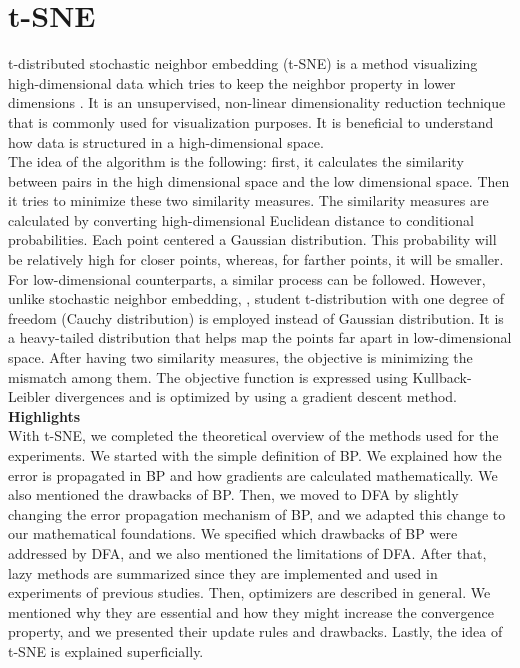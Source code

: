 \documentclass[a4paper, nobind]{templates/ociamthesis}
\begin{document}
\hypertarget{t-sne}{%
\section{t-SNE}\label{t-sne}}

t-distributed stochastic neighbor embedding (t-SNE) is a method visualizing high-dimensional data which tries to keep the neighbor property in lower dimensions \cite{vanDerMaaten2008}. It is an unsupervised, non-linear dimensionality reduction technique that is commonly used for visualization purposes. It is beneficial to understand how data is structured in a high-dimensional space.\\
The idea of the algorithm is the following: first, it calculates the similarity between pairs in the high dimensional space and the low dimensional space. Then it tries to minimize these two similarity measures. The similarity measures are calculated by converting high-dimensional Euclidean distance to conditional probabilities. Each point centered a Gaussian distribution. This probability will be relatively high for closer points, whereas, for farther points, it will be smaller. For low-dimensional counterparts, a similar process can be followed. However, unlike stochastic neighbor embedding, \cite{Hinton_Roweis_2003}, student t-distribution with one degree of freedom (Cauchy distribution) is employed instead of Gaussian distribution. It is a heavy-tailed distribution that helps map the points far apart in low-dimensional space. After having two similarity measures, the objective is minimizing the mismatch among them. The objective function is expressed using Kullback-Leibler divergences and is optimized by using a gradient descent method.\\

\noindent \textbf{Highlights}\\
\noindent With t-SNE, we completed the theoretical overview of the methods used for the experiments. We started with the simple definition of BP. We explained how the error is propagated in BP and how gradients are calculated mathematically. We also mentioned the drawbacks of BP. Then, we moved to DFA by slightly changing the error propagation mechanism of BP, and we adapted this change to our mathematical foundations. We specified which drawbacks of BP were addressed by DFA, and we also mentioned the limitations of DFA. After that, lazy methods are summarized since they are implemented and used in experiments of previous studies. Then, optimizers are described in general. We mentioned why they are essential and how they might increase the convergence property, and we presented their update rules and drawbacks. Lastly, the idea of t-SNE is explained superficially.
\end{document}
